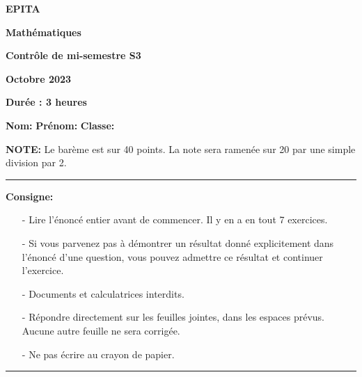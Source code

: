 \documentclass{article}
\author{}
\date{}
\title{}
\begin{document}
\maketitle
\begin{centering}
    \item \noindent\textbf{\Huge EPITA}\newline\newline
    \item \noindent\textbf{\huge Mathématiques}\newline\newline
    \item \noindent\textbf{Contrôle de mi-semestre S3}\newline\newline
    \item \noindent\textbf{Octobre 2023}\newline\newline
    \item \noindent\textbf{Durée : 3 heures}\newline\newline
    \item 
\end{centering}

\noindent\textbf{Nom: }\newline\newline
\noindent\textbf{Prénom: }\newline\newline
\noindent\textbf{Classe: }\newline\newline\newline\newline

\noindent\textbf{\Large NOTE: }\newline
Le barème est sur 40 points. La note sera ramenée sur 20 par une simple division par 2.\newline

\noindent\rule{\textwidth}{1pt}
\textbf{\Large Consigne:}
\begin{itemize}
    \item[-] Lire l'énoncé entier avant de commencer. Il y en a en tout 7 exercices.
    \item[-] Si vous parvenez pas à démontrer un résultat donné explicitement dans l'énoncé d'une question, vous pouvez admettre ce résultat et continuer l'exercice.
    \item[-] Documents et calculatrices interdits.
    \item[-] Répondre directement sur les feuilles jointes, dans les espaces prévus. Aucune autre feuille ne sera corrigée.
    \item[-] Ne pas écrire au crayon de papier.
\end{itemize}
\noindent\rule{\textwidth}{1pt}
\end{document}
